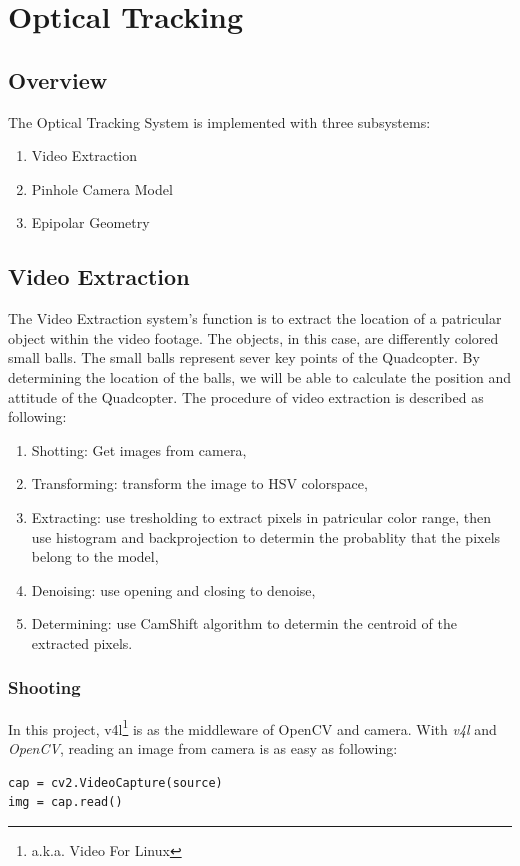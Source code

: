 \section{Optical Tracking}
\subsection{Overview}
The Optical Tracking System is implemented with three subsystems: 
\begin{enumerate}
  \item Video Extraction
  \item Pinhole Camera Model
  \item Epipolar Geometry
\end{enumerate}
\subsection{Video Extraction}
The Video Extraction system's function is to extract the location of a patricular object within the video footage. The objects, in this case, are differently colored small balls. The small balls represent sever key points of the Quadcopter. By determining the location of the balls, we will be able to calculate the position and attitude of the Quadcopter.
The procedure of video extraction is described as following:
\begin{enumerate}
  \item Shotting: Get images from camera,
  \item Transforming: transform the image to HSV colorspace,
  \item Extracting: use tresholding to extract pixels in patricular color range, then use histogram and backprojection to determin the probablity that the pixels belong to the model,
  \item Denoising: use opening and closing to denoise,
  \item Determining: use CamShift algorithm to determin the centroid of the extracted pixels.
\end{enumerate}
\subsubsection{Shooting}
In this project, v4l\footnote{a.k.a. Video For Linux} is as the middleware of OpenCV and camera. With \emph{v4l} and \emph{OpenCV}, reading an image from camera is as easy as following:
\lstset{language=python}
\begin{lstlisting}
cap = cv2.VideoCapture(source)
img = cap.read()
\end{lstlisting}
